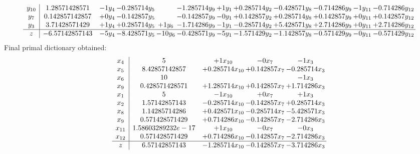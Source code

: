 \documentclass[11pt]{article}
\begin{document}
\[\begin{array}{c| c c@{\hskip 2pt} c@{\hskip 2pt} c@{\hskip 2pt} c@{\hskip 2pt} c@{\hskip 2pt} c@{\hskip 2pt} c@{\hskip 2pt} c@{\hskip 2pt} c@{\hskip 2pt} c@{\hskip 2pt} }
 y_{10}   &  1.28571428571 & -1 y_{4} & -0.285714 y_{5} &   & -1.285714 y_{9} & + 1 y_{1} & + 0.285714 y_{2} & -0.428571 y_{8} & -0.714286 y_{9} & -1 y_{11} & -0.714286 y_{12}\\
 y_{7}   &  0.142857142857 & + 0 y_{4} & -0.142857 y_{5} &   & -0.142857 y_{9} & -0 y_{1} & + 0.142857 y_{2} & + 0.285714 y_{8} & + 0.142857 y_{9} & + 0 y_{11} & + 0.142857 y_{12}\\
 y_{3}   &  3.71428571429 & + 1 y_{4} & + 0.285714 y_{5} & + 1 y_{6} & -1.714286 y_{9} & -1 y_{1} & -0.285714 y_{2} & + 5.428571 y_{8} & + 2.714286 y_{9} & + 0 y_{11} & + 2.714286 y_{12}\\
\hline
z    &  -6.57142857143 & -5 y_{4} & -8.428571 y_{5} & -10 y_{6} & -0.428571 y_{9} & -5 y_{1} & -1.571429 y_{2} & -1.142857 y_{8} & -0.571429 y_{9} & -0 y_{11} & -0.571429 y_{12}\\
\end{array}\]
 Final primal dictionary obtained: 
\[\begin{array}{c| c c@{\hskip 2pt} c@{\hskip 2pt} c@{\hskip 2pt} }
 x_{4}   &  5 & + 1 x_{10} & -0 x_{7} & -1 x_{3}\\
 x_{5}   &  8.42857142857 & + 0.285714 x_{10} & + 0.142857 x_{7} & -0.285714 x_{3}\\
 x_{6}   &  10  &    &   & -1 x_{3}\\
 x_{9}   &  0.428571428571 & + 1.285714 x_{10} & + 0.142857 x_{7} & + 1.714286 x_{3}\\
 x_{1}   &  5 & -1 x_{10} & + 0 x_{7} & + 1 x_{3}\\
 x_{2}   &  1.57142857143 & -0.285714 x_{10} & -0.142857 x_{7} & + 0.285714 x_{3}\\
 x_{8}   &  1.14285714286 & + 0.428571 x_{10} & -0.285714 x_{7} & -5.428571 x_{3}\\
 x_{9}   &  0.571428571429 & + 0.714286 x_{10} & -0.142857 x_{7} & -2.714286 x_{3}\\
 x_{11}   &  1.58603289232e-17 & + 1 x_{10} & -0 x_{7} & -0 x_{3}\\
 x_{12}   &  0.571428571429 & + 0.714286 x_{10} & -0.142857 x_{7} & -2.714286 x_{3}\\
\hline
z    &  6.57142857143 & -1.285714 x_{10} & -0.142857 x_{7} & -3.714286 x_{3}\\
\end{array}\]
\end{document}
